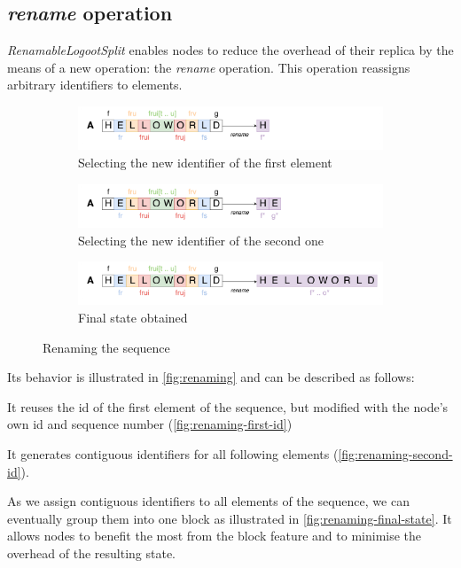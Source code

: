 \documentclass[sigplan,10pt]{acmart}
\begin{document}
\subsection{\emph{rename} operation}

\emph{RenamableLogootSplit} enables nodes to reduce the overhead of their replica by the means of a new operation: the \emph{rename} operation.
This operation reassigns arbitrary identifiers to elements.

\begin{figure}
    \begin{subfigure}{\columnwidth}
        \centering
        \includegraphics[width=0.9\columnwidth]{img/renaming-first-id.png}
        \caption{Selecting the new identifier of the first element}
        \label{fig:renaming-first-id}
    \end{subfigure}
    \begin{subfigure}{\columnwidth}
        \centering
        \includegraphics[width=0.9\columnwidth]{img/renaming-second-id.png}
        \caption{Selecting the new identifier of the second one}
        \label{fig:renaming-second-id}
    \end{subfigure}
    \begin{subfigure}{\columnwidth}
        \centering
        \includegraphics[width=0.9\columnwidth]{img/renaming-final-state.png}
        \caption{Final state obtained}
        \label{fig:renaming-final-state}
    \end{subfigure}
    \caption{Renaming the sequence}
    \label{fig:renaming}
\end{figure}

Its behavior is illustrated in \autoref{fig:renaming} and can be described as follows:
\begin{enumerate*}
    \item It reuses the id of the first element of the sequence, but modified with the node's own id and sequence number (\autoref{fig:renaming-first-id})
    \item It generates contiguous identifiers for all following elements (\autoref{fig:renaming-second-id}).
\end{enumerate*}
As we assign contiguous identifiers to all elements of the sequence, we can eventually group them into one block as illustrated in \autoref{fig:renaming-final-state}.
It allows nodes to benefit the most from the block feature and to minimise the overhead of the resulting state.
\end{document}

